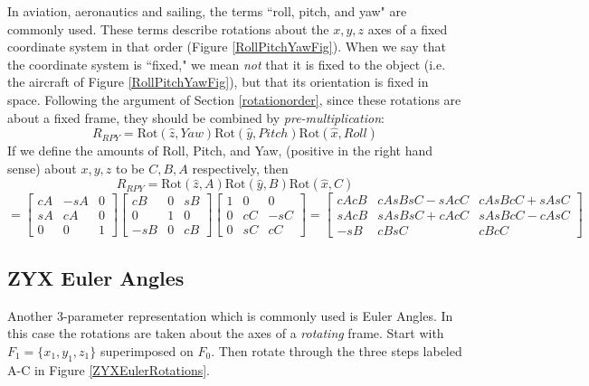 In aviation, aeronautics and sailing, the terms ``roll, pitch, and yaw" are commonly used.  These terms describe rotations about the $x,y,z$ axes of a fixed coordinate system in that order (Figure \ref{RollPitchYawFig}).  When we say that the coordinate system is ``fixed," we mean {\it not } that it is fixed to the object (i.e. the aircraft of Figure \ref{RollPitchYawFig}), but that its orientation is fixed in space.  Following the argument of Section \ref{rotationorder}, since these rotations are about a fixed frame, they should be combined by {\it pre-multiplication}:
\begin{equation}\label{RPYeqn}
R_{RPY} = \mathrm{Rot}(\hat{z}, Yaw)  \mathrm{Rot}(\hat{y}, Pitch)  \mathrm{Rot}(\hat{x}, Roll)
\end{equation}
If we define the amounts of Roll, Pitch, and Yaw, (positive in the right hand sense) about $x,y,z$ to be $C, B, A$ respectively, then
\[
R_{RPY} = \mathrm{Rot}(\hat{z}, A)  \mathrm{Rot}(\hat{y}, B)  \mathrm{Rot}(\hat{x}, C)
\]
\[
=
\begin{bmatrix}
 cA   & -sA  &  0    \\
 sA   &  cA  &  0    \\
 0    &   0  &  1
\end{bmatrix}
\begin{bmatrix}
cB    &  0   &  sB  \\
0     &  1   &  0   \\
-sB   &  0   &  cB
\end{bmatrix}
\begin{bmatrix}
 1    &  0   &   0  \\
 0    &  cC  &  -sC \\
 0    &  sC  &  cC
\end{bmatrix}
= \begin{bmatrix}
cAcB  &  cAsBsC-sAcC    &  cAsBcC+sAsC   \\
sAcB  &  sAsBsC+cAcC    &  sAsBcC-cAsC   \\
-sB   &  cBsC           &    cBcC
\end{bmatrix}
\]



\subsection{ZYX Euler Angles}\label{ZYXEuler}


Another 3-parameter representation which is commonly used is Euler Angles.
In this case the rotations are taken about the axes of a {\it rotating} frame.
Start with $F_1 = \{x_1,y_1,z_1\}$ superimposed on $F_0$.  Then rotate through the three steps labeled A-C in Figure \ref{ZYXEulerRotations}.

